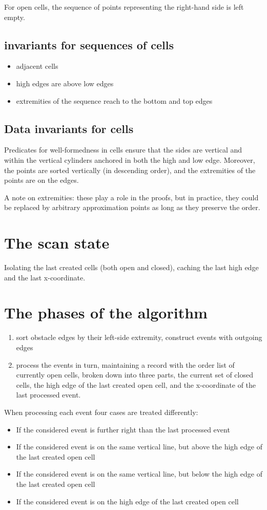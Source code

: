 \documentclass[a4paper, USenglish, cleveref, autoref, thm-restate]{lipics-v2021}
\begin{document}
For open cells, the sequence of points representing the right-hand side is
left empty.

\subsection{invariants for sequences of cells}
\begin{itemize}
\item adjacent cells
\item high edges are above low edges
\item extremities of the sequence reach to the bottom and top edges
\end{itemize}
\subsection{Data invariants for cells}
Predicates for well-formedness in cells ensure that the sides are
vertical and within the vertical cylinders anchored in both the high
and low edge.  Moreover, the points are sorted vertically (in
descending order), and the extremities of the points are on the edges.

A note on extremities: these play a role in the proofs, but in
practice, they could be replaced by arbitrary approximation
points as long as they preserve the order.

\section{The scan state}

Isolating the last created cells (both open and closed), caching the last
high edge and the last x-coordinate.

\section{The phases of the algorithm}
\begin{enumerate}
\item sort obstacle edges by their left-side extremity, construct events with
outgoing edges
\item process the events in turn, maintaining a record with the order list
of currently open cells, broken down into three parts, the current set
of closed cells, the high edge of the last created open cell, and the
x-coordinate of the last processed event.
\end{enumerate}

When processing each event four cases are treated differently:
\begin{itemize}
\item If the considered event is further right than the last processed event
\item If the considered event is on the same vertical line, but above the
high edge of the last created open cell
\item If the considered event is on the same vertical line, but below the
high edge of the last created open cell
\item If the considered event is on the high edge of the last created open cell
\end{itemize}
\end{document}
